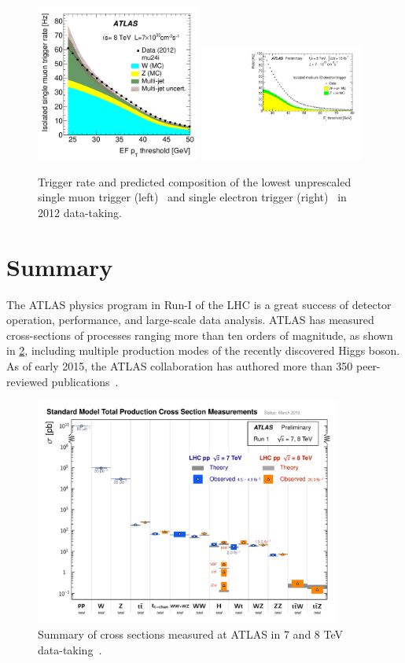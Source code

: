 \begin{figure}[tp]
  \centering
  \includegraphics[width=0.48\textwidth]{figures/TRIG-2012-03/fig_04b}
  \includegraphics[width=0.48\textwidth]{figures/trigger/Plots2014ICHEP_Fig2a}
  \caption{Trigger rate and predicted composition of the lowest unprescaled single muon trigger (left)~\cite{TRIG-2012-03} and single electron trigger (right)~\cite{EgammaTriggerPublicResults} in 2012 data-taking.}
  \label{fig:prospects-trigger-HLT}
\end{figure}

\section{Summary}

The ATLAS physics program in Run-I of the LHC is a great success of detector operation, performance, and large-scale data analysis. ATLAS has measured cross-sections of processes ranging more than ten orders of magnitude, as shown in \cref{fig:atlas-measurements}, including multiple production modes of the recently discovered Higgs boson. As of early 2015, the ATLAS collaboration has authored more than 350 peer-reviewed publications~\cite{ATLASPublications}.

\begin{figure}[tp]
  \centering
  \includegraphics[width=0.90\textwidth]{figures/lhc-atlas/ATLAS_a_SMSummary_TotalXsect}
  \caption{Summary of cross sections measured at ATLAS in 7 and 8 TeV data-taking~\cite{2015.atlas-summary-SM}.}
  \label{fig:atlas-measurements}
\end{figure}


